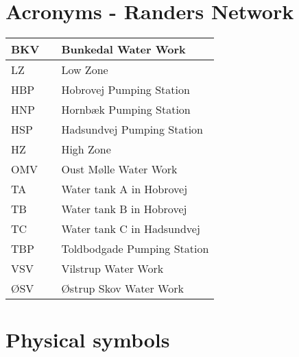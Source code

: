 \section*{Acronyms - Randers Network}
	
	\begin{tabular}{|l c l|} \hline
		BKV     &&	Bunkedal Water Work 									\\ \hline
		LZ      &&	Low Zone												\\ \hline
		HBP     &&	Hobrovej Pumping Station 								\\ \hline
		HNP     &&	Hornbæk Pumping Station 								\\ \hline
		HSP 	&&	Hadsundvej Pumping Station 								\\ \hline		
		HZ      &&	High Zone												\\ \hline
		OMV		&&	Oust Mølle Water Work 									\\ \hline
		TA 		&&	Water tank A in Hobrovej 								\\ \hline
		TB 		&&	Water tank B in Hobrovej 								\\ \hline
		TC 		&&	Water tank C in Hadsundvej 								\\ \hline
		TBP 	&&	Toldbodgade Pumping Station 							\\ \hline
		VSV 	&&	Vilstrup Water Work 									\\ \hline
		ØSV 	&&	Østrup Skov Water Work 									\\ \hline
	\end{tabular}

\newpage

\section*{Physical symbols}


